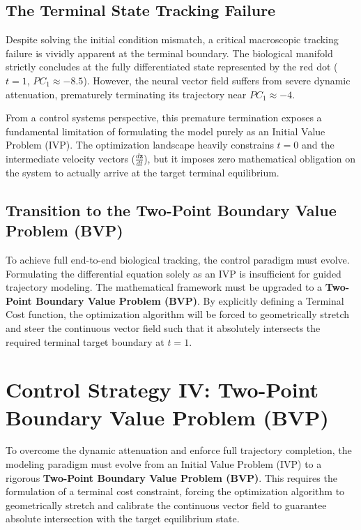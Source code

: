 \documentclass[12pt, a4paper]{article}
\begin{document}
	\subsection{The Terminal State Tracking Failure}
	Despite solving the initial condition mismatch, a critical macroscopic tracking failure is vividly apparent at the terminal boundary. The biological manifold strictly concludes at the fully differentiated state represented by the red dot ($t=1$, $PC_1 \approx -8.5$). However, the neural vector field suffers from severe dynamic attenuation, prematurely terminating its trajectory near $PC_1 \approx -4$. 
	
	From a control systems perspective, this premature termination exposes a fundamental limitation of formulating the model purely as an Initial Value Problem (IVP). The optimization landscape heavily constrains $t=0$ and the intermediate velocity vectors ($\frac{d\mathbf{z}}{dt}$), but it imposes zero mathematical obligation on the system to actually arrive at the target terminal equilibrium.
	
	\subsection{Transition to the Two-Point Boundary Value Problem (BVP)}
	To achieve full end-to-end biological tracking, the control paradigm must evolve. Formulating the differential equation solely as an IVP is insufficient for guided trajectory modeling. The mathematical framework must be upgraded to a \textbf{Two-Point Boundary Value Problem (BVP)}. By explicitly defining a Terminal Cost function, the optimization algorithm will be forced to geometrically stretch and steer the continuous vector field such that it absolutely intersects the required terminal target boundary at $t=1$.
	
	\section{Control Strategy IV: Two-Point Boundary Value Problem (BVP)}
	
	To overcome the dynamic attenuation and enforce full trajectory completion, the modeling paradigm must evolve from an Initial Value Problem (IVP) to a rigorous \textbf{Two-Point Boundary Value Problem (BVP)}. This requires the formulation of a terminal cost constraint, forcing the optimization algorithm to geometrically stretch and calibrate the continuous vector field to guarantee absolute intersection with the target equilibrium state.
	
\end{document}
